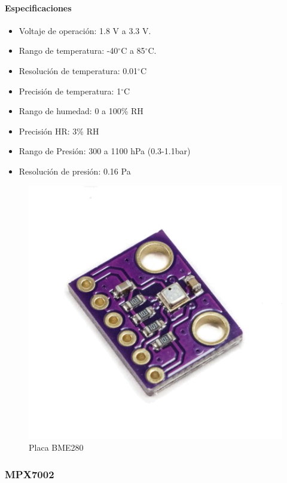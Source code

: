 \documentclass[12pt,a4paper]{article}
\newcommand{\grad}{$^{\circ}$}
\begin{document}
		\paragraph*{Especificaciones}
		\begin{itemize}
		\item   Voltaje de operación: 1.8 V a 3.3 V.
		\item	Rango de temperatura: -40\grad C a 85\grad C.
		\item   Resolución de temperatura: 0.01\grad C
		\item	Precisión de temperatura: 1\grad C 
		\item	Rango de humedad: 0 a 100\% RH
		\item   Precisión HR: 3\% RH
		\item Rango de Presión: 300 a 1100 hPa (0.3-1.1bar)
		\item Resolución de presión: 0.16 Pa
	\end{itemize}
	
		\begin{figure}[htb]
		\centering
		\includegraphics[scale=0.35]{bme280.png}
		\caption{Placa BME280}
		\label{fig:BME280}
		\end{figure}
	
	\subsubsection{MPX7002}
	
\end{document}
